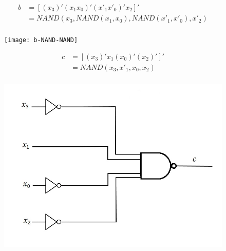 \documentclass{article}
\begin{document}
\begin{equation*}
\begin{split}
b & = [ (x_3)' (x_1 x_0)' (x'_1 x'_0)' x_2 ]' \\
  & = NAND(x_3, NAND(x_1, x_0), NAND(x'_1, x'_0), x'_2) \\
\end{split}
\end{equation*}
\clearpage
\begin{figure}[ht]
\centering
\texttt{[image: b-NAND-NAND]}
\end{figure}


\begin{equation*}
\begin{split}
c & = [ (x_3)' x_1 (x_0)' (x_2)' ]' \\ 
  & = NAND(x_3, x'_1, x_0, x_2) \\
\end{split}
\end{equation*}
\begin{figure}[h!]
\centering
\includegraphics[scale=0.25]{c-NAND-NAND}
\end{figure}
\end{document}

